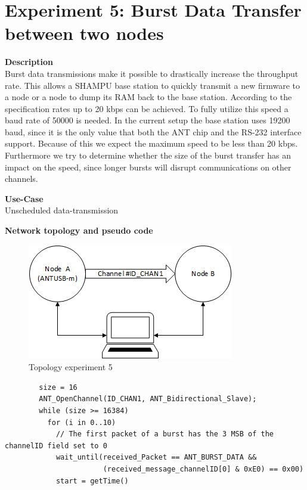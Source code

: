 \section{Experiment 5: Burst Data Transfer between two nodes}
\begin{description} 
	\item{\textbf{Description}} \hfill \\ Burst data transmissions make it possible to drastically increase the throughput rate. This allows a SHAMPU base station to quickly transmit a new firmware to a node or a node to dump its RAM back to the base station.	According to the specification rates up to 20 kbps can be achieved. To fully utilize this speed a baud rate of 50000 is needed\cite{BurstMax}. In the current setup the base station uses 19200 baud, since it is the only value that both the ANT chip and the RS-232 interface support. Because of this we expect the maximum speed to be less than 20 kbps. Furthermore we try to determine whether the size of the burst transfer has an impact on the speed, since longer bursts will disrupt communications on other channels.
	\item{\textbf{Use-Case}} \hfill \\ Unscheduled data-transmission
	\item{\textbf{Network topology and pseudo code}} \hfill \\ 
	\begin{figure}[H]
		\centering
		\includegraphics[scale=1]{content/images/exp5_topo.png}
		\caption{Topology experiment 5}
	\end{figure}
	\begin{code}[H]
		\begin{verbatim}
		size = 16
		ANT_OpenChannel(ID_CHAN1, ANT_Bidirectional_Slave);		
		while (size >= 16384)
		  for (i in 0..10) 
		    // The first packet of a burst has the 3 MSB of the channelID field set to 0
		    wait_until(received_Packet == ANT_BURST_DATA && 
		               (received_message_channelID[0] & 0xE0) == 0x00)
		    start = getTime()

\end{verbatim}
\end{code}
\end{description}
